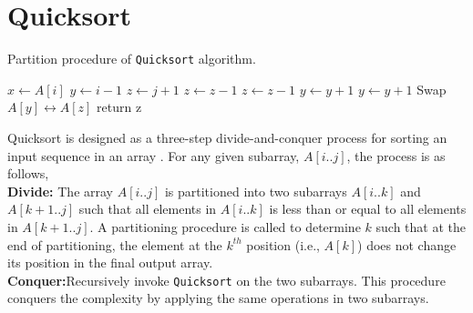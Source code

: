 \documentclass[a4paper, 10pt,twocolumn]{article}
\begin{document}
\section{Quicksort}
\begin{algorithm}[t]
  \caption{Partition procedure of \texttt{Quicksort} algorithm.}
  \label{algo:ins_sort1}
  \begin{algorithmic}[1]
     \newline
     \newline
      \State $x \leftarrow A[i]$
      \State $y \leftarrow i-1$
      \State $z \leftarrow j+1$      
          \State $z \leftarrow z-1$         
            \State $z \leftarrow z-1$ 
         \EndWhile
        \State $y \leftarrow y+1 $
        	\State $y \leftarrow y+1$
        \EndWhile        
            \State Swap $A[y] \leftrightarrow A[z]$
        \Else
        	\State return z
        \EndIf
      \EndWhile
     \EndProcedure 
  \end{algorithmic}
\end{algorithm}
Quicksort is designed as a three-step divide-and-conquer process for sorting an input sequence in an array \cite{comen}. For any given subarray, $A[i..j]$, the process is as follows, \\
\textbf{Divide:} The array $A[i..j]$ is partitioned into two subarrays $A[i..k]$ and $A[k+1..j]$ such that all elements in $A[i..k]$ is less than or equal to all elements in $A[k+1..j]$. A partitioning procedure is called to determine $k$ such that at the end of partitioning, the element at the $k^{th}$ position (i.e., $A[k]$) does not change its position in the final output array. \\ 
\textbf{Conquer:}Recursively invoke \texttt{Quicksort} on the two subarrays. This procedure conquers the complexity by applying the same operations in two subarrays. 
\end{document}
